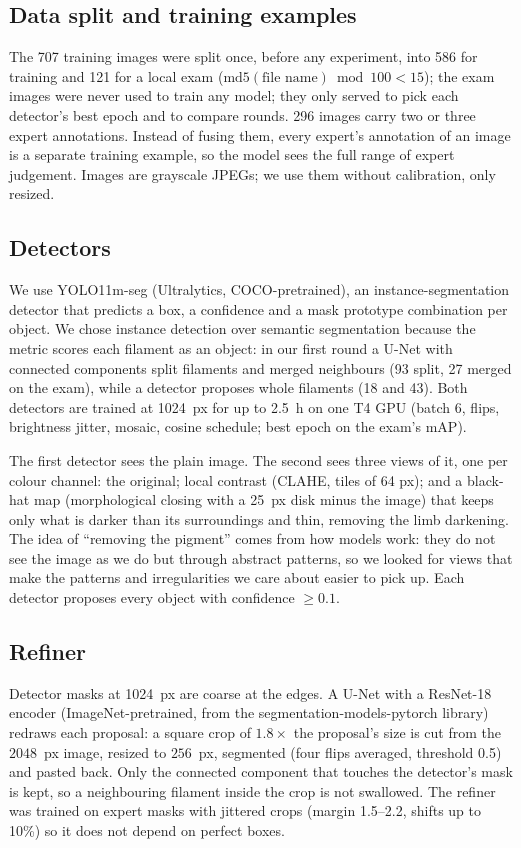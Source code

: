 \documentclass[sigconf]{acmart}
\begin{document}
\subsection{Data split and training examples}
The 707 training images were split once, before any experiment, into 586 for training and 121 for a local exam ($\mathrm{md5}(\text{file name}) \bmod 100 < 15$); the exam images were never used to train any model; they only served to pick each detector's best epoch and to compare rounds. 296 images carry two or three expert annotations. Instead of fusing them, every expert's annotation of an image is a separate training example, so the model sees the full range of expert judgement. Images are grayscale JPEGs; we use them without calibration, only resized.

\subsection{Detectors}
We use YOLO11m-seg \cite{yolo11} (Ultralytics, COCO-pretrained), an instance-segmentation detector that predicts a box, a confidence and a mask prototype combination per object. We chose instance detection over semantic segmentation because the metric scores each filament as an object: in our first round a U-Net with connected components split filaments and merged neighbours (93 split, 27 merged on the exam), while a detector proposes whole filaments (18 and 43). Both detectors are trained at 1024~px for up to 2.5~h on one T4 GPU (batch 6, flips, brightness jitter, mosaic, cosine schedule; best epoch on the exam's mAP).

The first detector sees the plain image. The second sees three views of it, one per colour channel: the original; local contrast (CLAHE, tiles of 64 px); and a black-hat map (morphological closing with a 25~px disk minus the image) that keeps only what is darker than its surroundings and thin, removing the limb darkening. The idea of ``removing the pigment'' comes from how models work: they do not see the image as we do but through abstract patterns, so we looked for views that make the patterns and irregularities we care about easier to pick up. Each detector proposes every object with confidence $\ge 0.1$.

\subsection{Refiner}
Detector masks at 1024~px are coarse at the edges. A U-Net \cite{unet} with a ResNet-18 encoder (ImageNet-pretrained, from the segmentation-models-pytorch library) redraws each proposal: a square crop of $1.8\times$ the proposal's size is cut from the $2048$~px image, resized to $256$~px, segmented (four flips averaged, threshold 0.5) and pasted back. Only the connected component that touches the detector's mask is kept, so a neighbouring filament inside the crop is not swallowed. The refiner was trained on expert masks with jittered crops (margin 1.5--2.2, shifts up to 10\%) so it does not depend on perfect boxes.
\end{document}
